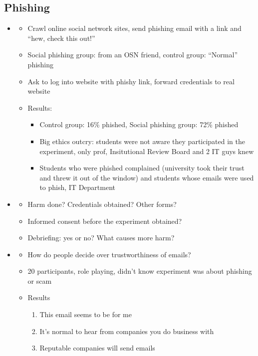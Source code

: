 \documentclass[a4paper,12pt]{scrartcl}
\begin{document}
\subsection{Phishing}
\begin{itemize}
	\item
		\begin{itemize}
			\item
				Crawl online social network sites, send phishing email with a link 
				and \enquote{hew, check this out!}
			\item
				Social phishing group: from an OSN friend, control group: \enquote{Normal} phishing
			\item
				Ask to log into website with phishy link, forward credentials to real website
			\item
				Results:
				\begin{itemize}
					\item
						Control group: 16\% phished, Social phishing group: 72\% phished
					\item
						Big ethics outcry: students were not aware they participated in the experiment, only prof, Insitutional Review Board and 2 IT guys knew
					\item
						Students who were phished complained (university took their trust and threw it out of the window) and students whose emails were used to phish, IT Department
				\end{itemize}
		\end{itemize}
	\item
		\begin{itemize}
			\item
				Harm done? Credentials obtained? Other forms?
			\item
				Informed consent before the experiment obtained?
			\item
				Debriefing: yes or no? What causes more harm?
		\end{itemize}
	\item
		\begin{itemize}
			\item
				How do people decide over trustworthiness of emails?
			\item
				20 participants, role playing, didn't know experiment was about phishing or scam
			\item
				Results 
				\begin{enumerate}
					\item
						This email seems to be for me
					\item
						It's normal to hear from companies you do business with
					\item
						Reputable companies will send emails
				\end{enumerate}


\end{itemize}
\end{itemize}
\end{document}
